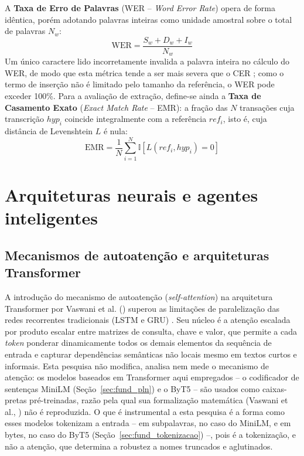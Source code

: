 A \textbf{Taxa de Erro de Palavras} (WER -- \textit{Word Error Rate}) opera de forma idêntica, porém adotando palavras inteiras como unidade amostral sobre o total de palavras $N_w$:
\begin{equation}
	\text{WER} = \frac{S_w + D_w + I_w}{N_w}
\end{equation}
Um único caractere lido incorretamente invalida a palavra inteira no cálculo do WER, de modo que esta métrica tende a ser mais severa que o CER \cite{araujo2024saneamento}; como o termo de inserção não é limitado pelo tamanho da referência, o WER pode exceder 100\%. Para a avaliação de extração, define-se ainda a \textbf{Taxa de Casamento Exato} (\textit{Exact Match Rate} -- EMR): a fração das $N$ transações cuja transcrição $hyp_i$ coincide integralmente com a referência $ref_i$, isto é, cuja distância de Levenshtein $L$ é nula:
\begin{equation}
	\label{eq:emr}
	\text{EMR} = \frac{1}{N} \sum_{i=1}^{N} \mathbb{I}[L(ref_i, hyp_i) = 0]
\end{equation}

\section{Arquiteturas neurais e agentes inteligentes}
\label{sec:fund_arquiteturas_agentes}

\subsection{Mecanismos de autoatenção e arquiteturas Transformer}
A introdução do mecanismo de autoatenção (\textit{self-attention}) na arquitetura Transformer por Vaswani et al. (\citeyear{vaswani2017attention}) superou as limitações de paralelização das redes recorrentes tradicionais (LSTM e GRU) \cite{hochreiter1997long, cho2014learning}. Seu núcleo é a atenção escalada por produto escalar entre matrizes de consulta, chave e valor, que permite a cada \textit{token} ponderar dinamicamente todos os demais elementos da sequência de entrada e capturar dependências semânticas não locais mesmo em textos curtos e informais. Esta pesquisa não modifica, analisa nem mede o mecanismo de atenção: os modelos baseados em Transformer aqui empregados -- o codificador de sentenças MiniLM (Seção~\ref{sec:fund_pln}) e o ByT5 -- são usados como caixas-pretas pré-treinadas, razão pela qual sua formalização matemática (Vaswani et al., \citeyear{vaswani2017attention}) não é reproduzida. O que é instrumental a esta pesquisa é a forma como esses modelos tokenizam a entrada -- em subpalavras, no caso do MiniLM, e em bytes, no caso do ByT5 (Seção~\ref{sec:fund_tokenizacao}) --, pois é a tokenização, e não a atenção, que determina a robustez a nomes truncados e aglutinados.

